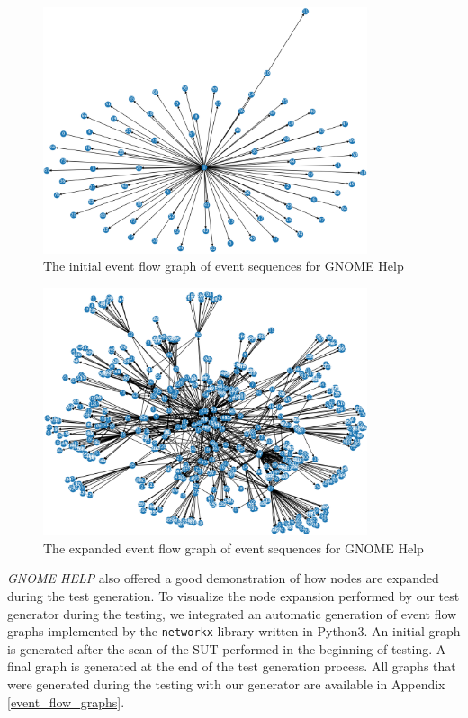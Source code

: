 \begin{figure}[htb!]
	\centering
	\includegraphics[width=0.85\textwidth,clip]{obrazky-figures/yelp_n_start.png}
	\caption{The initial event flow graph of event sequences for GNOME Help}
	\label{yelp_start}
\end{figure}

\begin{figure}[htb!]
	\centering
	\includegraphics[width=0.85\textwidth,clip]{obrazky-figures/yelp_n_final.png}
	\caption{The expanded event flow graph of event sequences for GNOME Help}
	\label{yelp_end}
\end{figure}

\textit{GNOME HELP} also offered a good demonstration of how nodes are expanded during the test generation. To visualize the node expansion performed by our test generator during the testing, we integrated an automatic generation of event flow graphs implemented by the \texttt{networkx} library written in Python3. An initial graph is generated after the scan of the SUT performed in the beginning of testing. A final graph is generated at the end of the test generation process. All graphs that were generated during the testing with our generator are available in Appendix \ref{event_flow_graphs}.

